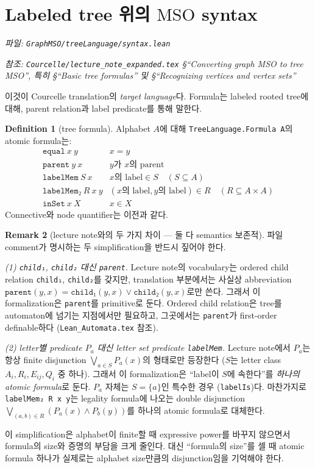 \documentclass[11pt]{article}
\theoremstyle{definition}
\newtheorem{definition}{Definition}[section]
\newtheorem{remark}[definition]{Remark}
\theoremstyle{plain}
\newcommand{\MSO}{\mathrm{MSO}}
\newcommand{\lean}[1]{\texttt{#1}}
\newcommand{\leanfile}[1]{\texttt{#1}}
\begin{document}
\section{Labeled tree 위의 \texorpdfstring{$\MSO$}{MSO} syntax}
\label{basics:sec:treesyntax}

\emph{파일: \leanfile{GraphMSO/treeLanguage/syntax.lean}}

\emph{참조: \leanfile{Courcelle/lecture\_note\_expanded.tex}
\S``Converting graph MSO to tree MSO'', 특히 \S``Basic tree formulas''
및 \S``Recognizing vertices and vertex sets''}

이것이 Courcelle translation의 \emph{target language}다. Formula는 labeled
rooted tree에 대해, parent relation과 label predicate를 통해 말한다.

\begin{definition}[tree formula]
\label{basics:def:treeformula}
Alphabet $A$에 대해 \lean{TreeLanguage.Formula A}의 atomic formula는:
\[
\begin{array}{ll}
  \lean{equal}\ x\ y & x = y \\
  \lean{parent}\ y\ x & \text{$y$가 $x$의 parent} \\
  \lean{labelMem}\ S\ x & x \text{의 label} \in S \quad (S \subseteq A) \\
  \lean{labelMem₂}\ R\ x\ y & (x \text{의 label}, y \text{의 label}) \in R \quad (R \subseteq A \times A) \\
  \lean{inSet}\ x\ X & x \in X
\end{array}
\]
Connective와 node quantifier는 이전과 같다.
\end{definition}

\begin{remark}[lecture note와의 두 가지 차이 --- 둘 다 semantics 보존적]
\label{basics:rem:treesimplify}
파일 comment가 명시하는 두 simplification을 반드시 짚어야 한다.

\emph{(1) \lean{child₁}, \lean{child₂} 대신 \lean{parent}.}
Lecture note의 vocabulary는 ordered child relation \lean{child₁},
\lean{child₂}를 갖지만, translation 부분에서는 사실상 abbreviation
$\lean{parent}(y,x) = \lean{child₁}(y,x) \lor \lean{child₂}(y,x)$로만 쓴다.
그래서 이 formalization은 \lean{parent}를 primitive로 둔다. Ordered child
relation은 tree를 automaton에 넘기는 지점에서만 필요하고, 그곳에서는
\lean{parent}가 first-order definable하다 (\leanfile{Lean\_Automata.tex} 참조).

\emph{(2) letter별 predicate $P_a$ 대신 letter \emph{set} predicate
\lean{labelMem}.}
Lecture note에서 $P_a$는 항상 finite disjunction
$\bigvee_{a \in S} P_a(x)$의 형태로만 등장한다 ($S$는 letter class
$A_i, R_i, E_{ij}, Q_i$ 중 하나). 그래서 이 formalization은 ``label이 $S$에
속한다''를 \emph{하나의 atomic formula}로 둔다. $P_a$ 자체는 $S = \{a\}$인
특수한 경우 (\lean{labelIs})다. 마찬가지로 \lean{labelMem₂ R x y}는 legality
formula에 나오는 double disjunction
$\bigvee_{(a,b) \in R} (P_a(x) \land P_b(y))$를 하나의 atomic formula로
대체한다.

이 simplification은 alphabet이 finite할 때 expressive power를 바꾸지 않으면서
formula의 size와 증명의 부담을 크게 줄인다. 대신 ``formula의 size''를 셀 때
atomic formula 하나가 실제로는 alphabet size만큼의 disjunction임을 기억해야
한다.
\end{remark}
\end{document}
